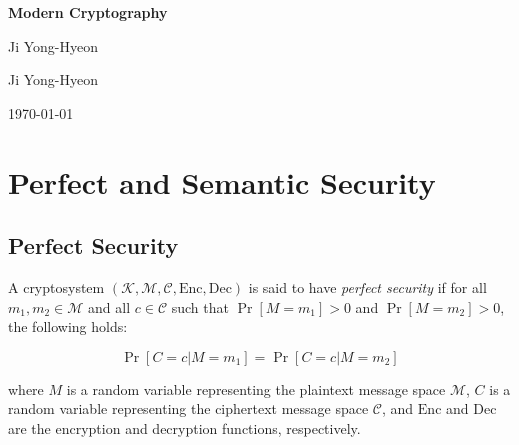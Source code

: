\documentclass[12pt,openany]{book}
\theoremstyle{definition}
\begin{document}
	
	\begin{titlepage}
		\begin{center}
			{\Huge\textsf{\textbf{Modern Cryptography}}\par}
			\vspace{0.5in}
			{\Large Ji Yong-Hyeon\par}
			\vspace{1in}
			\vspace{1in}
			{\large Ji Yong-Hyeon\par}
			{\large \today\par}
		\end{center}
	\end{titlepage}
	
	\tableofcontents
	
	\mainmatter
	
	\chapter{Perfect and Semantic Security}
	
	\section{Perfect Security}
	
	A cryptosystem $(\mathcal{K}, \mathcal{M}, \mathcal{C}, \text{Enc}, \text{Dec})$ is said to have \textit{perfect security} if for all $m_1, m_2 \in \mathcal{M}$ and all $c \in \mathcal{C}$ such that $\Pr[M = m_1] > 0$ and $\Pr[M = m_2] > 0$, the following holds:
	
	\begin{equation}
	\Pr[C = c | M = m_1] = \Pr[C = c | M = m_2]
	\end{equation}
	
	\noindent where $M$ is a random variable representing the plaintext message space $\mathcal{M}$, $C$ is a random variable representing the ciphertext message space $\mathcal{C}$, and $\text{Enc}$ and $\text{Dec}$ are the encryption and decryption functions, respectively.
	
\end{document}
